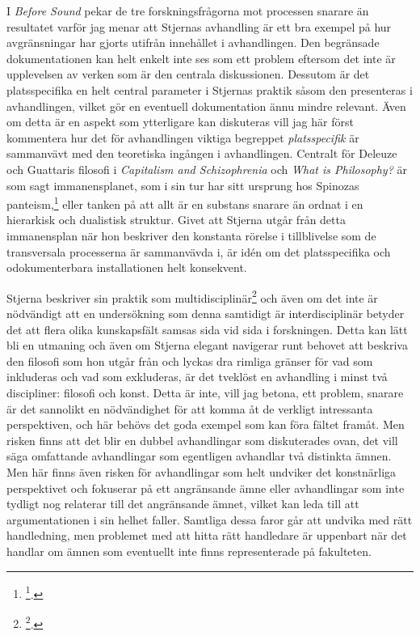 \documentclass[11pt]{article}
\begin{document}
I \emph{Before Sound} pekar de tre forskningsfrågorna mot processen snarare
än resultatet varför jag menar att Stjernas avhandling är ett bra
exempel på hur avgränsningar har gjorts utifrån innehållet i
avhandlingen. Den begränsade dokumentationen kan helt enkelt inte ses
som ett problem eftersom det inte är upplevelsen av verken som är den
centrala diskussionen. Dessutom är det platsspecifika en helt central
parameter i Stjernas praktik såsom den presenteras i avhandlingen,
vilket gör en eventuell dokumentation ännu mindre relevant. Även om
detta är en aspekt som ytterligare kan diskuteras vill jag här först
kommentera hur det för avhandlingen viktiga begreppet \emph{platsspecifik} är
sammanvävt med den teoretiska ingången i avhandlingen. Centralt för
Deleuze och Guattaris filosofi i \emph{Capitalism and Schizophrenia} och
\emph{What is Philosophy?} är som sagt immanensplanet, som i sin tur har sitt
ursprung hos Spinozas panteism,\footnote{\footcite[s.93]{Stjerna2018}.} eller tanken på att allt är en
substans snarare än ordnat i en hierarkisk och dualistisk struktur.
Givet att Stjerna utgår från detta immanensplan när hon beskriver den
konstanta rörelse i tillblivelse som de transversala processerna är
sammanvävda i, är idén om det platsspecifika och odokumenterbara
installationen helt konsekvent.

Stjerna beskriver sin praktik som multidisciplinär\footnote{\footcite[s.42]{Stjerna2018}.} och även om
det inte är nödvändigt att en undersökning som denna samtidigt är
interdisciplinär betyder det att flera olika kunskapsfält samsas sida
vid sida i forskningen. Detta kan lätt bli en utmaning och även om
Stjerna elegant navigerar runt behovet att beskriva den filosofi som hon
utgår från och lyckas dra rimliga gränser för vad som inkluderas och vad
som exkluderas, är det tveklöst en avhandling i minst två discipliner:
filosofi och konst. Detta är inte, vill jag betona, ett problem, snarare
är det sannolikt en nödvändighet för att komma åt de verkligt
intressanta perspektiven, och här behövs det goda exempel som kan föra
fältet framåt. Men risken finns att det blir en dubbel avhandlingar som
diskuterades ovan, det vill säga omfattande avhandlingar som egentligen
avhandlar två distinkta ämnen. Men här finns även risken för
avhandlingar som helt undviker det konstnärliga perspektivet och
fokuserar på ett angränsande ämne eller avhandlingar som inte tydligt
nog relaterar till det angränsande ämnet, vilket kan leda till att
argumentationen i sin helhet faller. Samtliga dessa faror går att
undvika med rätt handledning, men problemet med att hitta rätt
handledare är uppenbart när det handlar om ämnen som eventuellt inte
finns representerade på fakulteten.
\end{document}
